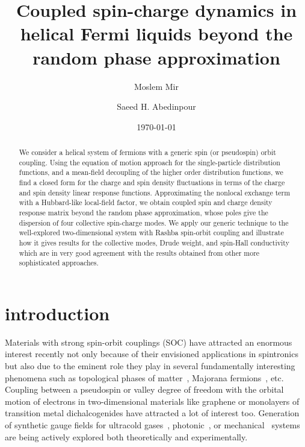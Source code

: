 \documentclass[aps, pra, reprint,superscriptaddress]{revtex4-1}
\begin{document}
\title{Coupled spin-charge dynamics in helical Fermi liquids beyond the random phase approximation}
\author{Moslem Mir}
\author{Saeed H. Abedinpour}
\date{\today}


\begin{abstract}
We consider a helical system of fermions with a generic spin (or pseudospin) orbit coupling. 
Using the equation of motion approach for the single-particle distribution functions, and a mean-field decoupling of the higher order distribution functions, we find a closed form for the charge and spin density fluctuations in terms of the charge and spin density linear response functions. 
Approximating the nonlocal exchange term with a Hubbard-like local-field factor, we obtain coupled spin and charge density response matrix beyond the random phase approximation, whose poles give the dispersion of four collective spin-charge modes. 
We apply our generic technique to the well-explored two-dimensional system with Rashba spin-orbit coupling and illustrate how it gives results for the collective modes, Drude weight, and spin-Hall conductivity which are in very good agreement with the results obtained from other more sophisticated approaches. 
\end{abstract}
\maketitle
 
\section{introduction}\label{sec:intro}
Materials with strong spin-orbit couplings (SOC) have attracted an enormous interest recently not only because of their envisioned applications in spintronics~\cite{Zutic, Awshalom2009, Manchon2015} but also due to the eminent role they play in several fundamentally interesting phenomena such as topological phases of matter~\cite{ZHassan2010}, Majorana fermions~\cite{LiangFu2008}, etc. 
Coupling between a pseudospin or valley degree of freedom with the orbital motion of electrons in two-dimensional materials like graphene or monolayers of transition metal dichalcogenides have attracted a lot of interest too. Generation of synthetic gauge fields for ultracold gases~\cite{dalibard_rmp2011,goldman_rpp2014}, photonic~\cite{YPlotnik2016}, or mechanical~\cite{abbaszadeh_arxiv2016} systems are being actively explored both theoretically and experimentally. 
\end{document}
